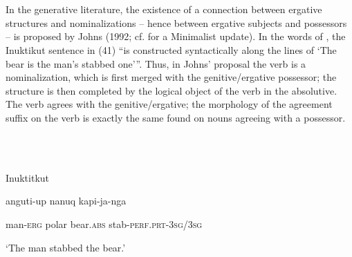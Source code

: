 \documentclass[output=paper]{langsci/langscibook}
\begin{document}
\begin{styleparagrafo}
\ea%
    \label{ex:key:40}
    \gll\\
        \\
    \glt
    \z

             
\end{styleparagrafo}

 

In the generative literature, the existence of a connection between ergative structures and nominalizations – hence between ergative subjects and possessors – is proposed by Johns (1992; cf. \citealt{Yuan2013} for a Minimalist update). In the words of \citet[61]{Johns1992}, the Inuktikut sentence in (41) “is constructed syntactically along the lines of ‘The bear is the man’s stabbed one’”. Thus, in Johns’ proposal the verb is a nominalization, which is first merged with the genitive/ergative possessor; the structure is then completed by the logical object of the verb in the absolutive. The verb agrees with the genitive/ergative; the morphology of the agreement suffix on the verb is exactly the same found on nouns agreeing with a possessor.

\ea%
    \label{ex:key:41}
    \gll\\
        \\
    \glt
    \z

          Inuktitkut \citep[61]{Johns1992}

anguti-up   nanuq     kapi-ja-nga

man-\textsc{erg}   polar bear.\textsc{abs}  stab-\textsc{perf.prt-3sg/3sg}

‘The man stabbed the bear.’
\end{document}
